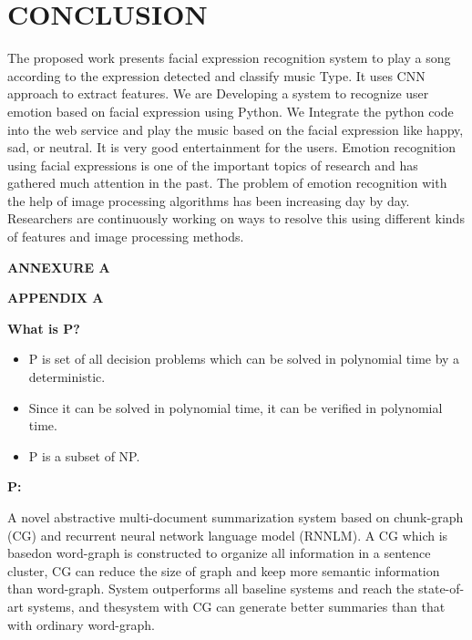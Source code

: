 \documentclass[12pt]{report}
\begin{document}
\section{CONCLUSION }
\justifying
\setlength{\parindent}{4em}
\setlength{\parskip}{0.5em}
\renewcommand{\baselinestretch}{1.5}
\normalsize

\hspace{1.7cm}The proposed work presents facial expression recognition system to play a song according 
to the expression detected and classify music Type. It uses CNN approach to extract features. We 
are Developing a system to recognize user emotion based on facial expression using Python. We 
Integrate the python code into the web service and play the music based on the facial expression 
like happy, sad, or neutral. It is very good entertainment for the users. Emotion recognition using 
facial expressions is one of the important topics of research and has gathered much attention in the 
past. The problem of emotion recognition with the help of image processing algorithms has been 
increasing day by day. Researchers are continuously working on ways to resolve this using different 
kinds of features and image processing methods.\\
\vspace{15cm}


\centering
\Large\textbf{ANNEXURE A }

\centering

\Large\textbf{APPENDIX A}\\
\justifying
\setlength{\parindent}{4em}
\setlength{\parskip}{0.5em}
\renewcommand{\baselinestretch}{1.5}
\normalsize
\raggedright\textbf{What is P?}
\begin{itemize}
\item P is set of all decision problems which can be solved in polynomial time by a
deterministic.\\
\item  Since it can be solved in polynomial time, it can be verified in polynomial time.\\
\item  P is a subset of NP.
\end{itemize}

\textbf{P:}

A novel abstractive multi-document summarization system based on chunk-graph (CG) and
recurrent neural network language model (RNNLM). A CG which is basedon word-graph is 
constructed to organize all information in a sentence cluster, CG can reduce the size of graph 
and keep more semantic information than word-graph. System outperforms all baseline systems 
and reach the state-of-art systems, and thesystem with CG can generate better summaries than
that with ordinary word-graph.
\end{document}
